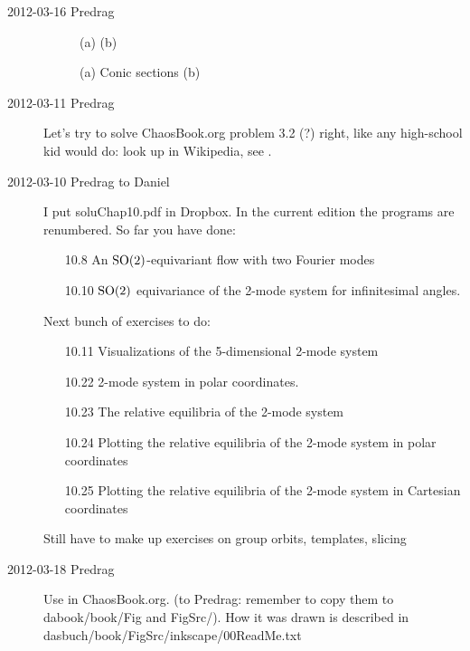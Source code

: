 \begin{description}
\item[2012-03-16 Predrag]

%
\begin{figure}\label{f:ConicplaneSects}
\centering
(a) %
(b) %
\caption{
(a) Conic sections (b)
}
\end{figure}

\item[2012-03-11 Predrag]
Let's try to solve ChaosBook.org problem 3.2 (?) right, like any
high-school kid would do: look up
 in
Wikipedia, see .

\item[2012-03-10 Predrag to Daniel] I put soluChap10.pdf in Dropbox. In
the current edition the programs are renumbered. So far you have done:
\begin{itemize}
  \item[10.8]  An $\textrm{SO}(2)$-equivariant flow with two Fourier modes
  \item[10.10] $\textrm{SO}(2)$ equivariance of the 2-mode system
           for infinitesimal angles.
\end{itemize}
Next bunch of exercises to do:
\begin{itemize}
  \item[10.11] Visualizations of the 5-dimensional 2-mode system
  \item[10.22] 2-mode system in polar coordinates.
  \item[10.23] The relative equilibria of the 2-mode system
  \item[10.24] Plotting the relative equilibria of
           the 2-mode system in polar coordinates
  \item[10.25] Plotting the relative equilibria of
           the 2-mode system in Cartesian coordinates
\end{itemize}

Still have to make up exercises on group orbits, templates, slicing


\item[2012-03-18 Predrag]               \toCB
Use  in ChaosBook.org. (to Predrag: remember to
copy them to dabook/book/Fig and FigSrc/). How it was drawn is described
in dasbuch/book/FigSrc/inkscape/00ReadMe.txt



\end{description}
